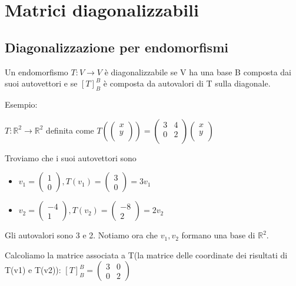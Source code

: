 \documentclass[a4paper, 10pt]{article}
\begin{document}
\section{Matrici diagonalizzabili}

\subsection{Diagonalizzazione per endomorfismi}
Un endomorfismo $T: V \rightarrow V$ è diagonalizzabile se V ha una base B composta dai suoi autovettori e se $[T]^B_B$ è composta da autovalori di T sulla diagonale.

Esempio:

$T: \mathbb{R}^2 \rightarrow \mathbb{R}^2$ definita come $T\left(\left(\begin{matrix}x\\y\\\end{matrix}\right)\right)=\left(\begin{matrix}3&4\\0&2\\\end{matrix}\right)\left(\begin{matrix}x\\y\\\end{matrix}\right)$

Troviamo che i suoi autovettori sono

\begin{itemize}
	\item $v_1=\begin{pmatrix}
		1 \\
		0
	\end{pmatrix}, T(v_1) = \begin{pmatrix}
	3 \\
	0
	\end{pmatrix} = 3v_1$
	\item  $v_2=\begin{pmatrix}
		-4 \\
		1
	\end{pmatrix}, T(v_2) = \begin{pmatrix}
	-8 \\
	2
	\end{pmatrix} = 2v_2$
\end{itemize}

Gli autovalori sono 3 e 2. Notiamo ora che $v_1, v_2$ formano una base di $\mathbb{R}^2$.

Calcoliamo la matrice associata a T(la matrice delle coordinate dei risultati di T(v1) e T(v2)): $[T]_B^B=\begin{pmatrix}
	3 & 0 \\
	0 & 2
\end{pmatrix}$
\end{document}
